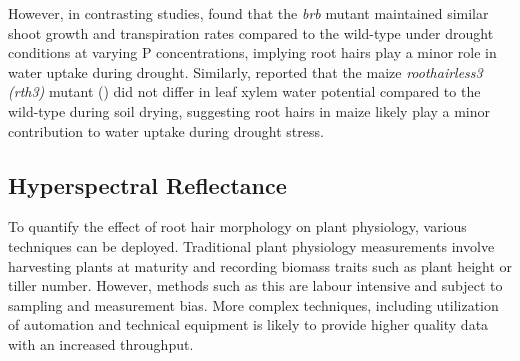 \documentclass{article}
\begin{document}
However, in contrasting studies, \cite{dodd_enhanced_2016} found that the \textit{brb} mutant maintained similar shoot growth and transpiration rates compared to the wild-type under drought conditions at varying P concentrations, implying root hairs play a minor role in water uptake during drought. Similarly, \cite{cai_soil_2021} reported that the maize \textit{roothairless3 (rth3)} mutant (\cite{hochholdinger_maize_2008}) did not differ in leaf xylem water potential compared to the wild-type during soil drying, suggesting root hairs in maize likely play a minor contribution to water uptake during drought stress.

\subsection{Hyperspectral Reflectance}
To quantify the effect of root hair morphology on plant physiology, various techniques can be deployed. Traditional plant physiology measurements involve harvesting plants at maturity and recording biomass traits such as plant height or tiller number. However, methods such as this are labour intensive and subject to sampling and measurement bias. More complex techniques, including utilization of automation and technical equipment is likely to provide higher quality data with an increased throughput.
\end{document}
